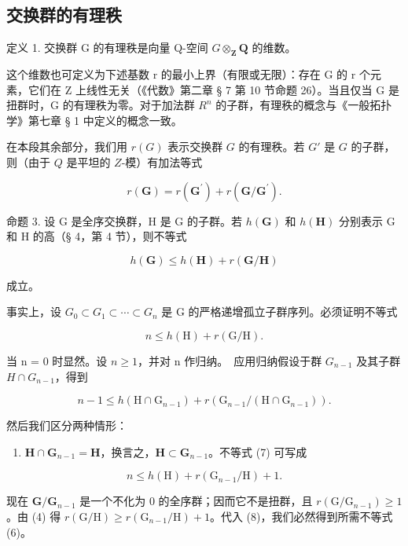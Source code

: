 \subsection{交换群的有理秩}

定义 1. 交换群 G 的有理秩是向量 Q-空间 \(G \otimes_{\mathbf{Z}} \mathbf{Q}\) 的维数。

这个维数也可定义为下述基数 r 的最小上界（有限或无限）：存在 G 的 r 个元素，它们在 Z 上线性无关（《代数》第二章 § 7 第 10 节命题 26）。当且仅当 G 是扭群时，G 的有理秩为零。对于加法群 \(R^{n}\) 的子群，有理秩的概念与《一般拓扑学》第七章 § 1 中定义的概念一致。

在本段其余部分，我们用 \(r(G)\) 表示交换群 \(G\) 的有理秩。若 \(G'\) 是 \(G\) 的子群，则（由于 \(Q\) 是平坦的 \(Z\)-模）有加法等式

\[
r (\mathbf {G}) = r \left(\mathbf {G} ^ {\prime}\right) + r \left(\mathbf {G} / \mathbf {G} ^ {\prime}\right).\tag{4}
\]

命题 3. 设 G 是全序交换群，H 是 G 的子群。若 \(h(\mathbf{G})\) 和 \(h(\mathbf{H})\) 分别表示 G 和 H 的高（§ 4，第 4 节），则不等式

\[
h (\mathbf {G}) \leqslant h (\mathbf {H}) + r (\mathbf {G} / \mathbf {H})\tag{5}
\]

成立。

事实上，设 \(G_{0} \subset G_{1} \subset \cdots \subset G_{n}\) 是 G 的严格递增孤立子群序列。必须证明不等式

\[
n \leqslant h (\mathrm{H}) + r (\mathrm{G} / \mathrm{H}).\tag{6}
\]

当 n = 0 时显然。设 \(n \geqslant 1\)，并对 n 作归纳。~应用归纳假设于群 \(G_{n-1}\) 及其子群 \(H \cap G_{n-1}\)，得到

\[
n - 1 \leqslant h (\mathrm{H} \cap \mathrm{G} _ {n - 1}) + r (\mathrm{G} _ {n - 1} / (\mathrm{H} \cap \mathrm{G} _ {n - 1})).\tag{7}
\]

然后我们区分两种情形：

\begin{enumerate}
\def\labelenumi{(\alph{enumi})}
\tightlist
\item
  \(\mathbf{H} \cap \mathbf{G}_{n-1} = \mathbf{H}\)，换言之，\(\mathbf{H} \subset \mathbf{G}_{n-1}\)。不等式 (7) 可写成
\end{enumerate}

\[
n \leqslant h (\mathrm{H}) + r (\mathrm{G} _ {n - 1} / \mathrm{H}) + 1.\tag{8}
\]

现在 \(\mathbf{G} / \mathbf{G}_{n - 1}\) 是一个不化为 0 的全序群；因而它不是扭群，且 \(r(\mathrm{G} / \mathrm{G}_{n - 1}) \geqslant 1\)。由 (4) 得 \(r(\mathrm{G} / \mathrm{H}) \geqslant r(\mathrm{G}_{n - 1} / \mathrm{H}) + 1\)。代入 (8)，我们必然得到所需不等式 (6)。

